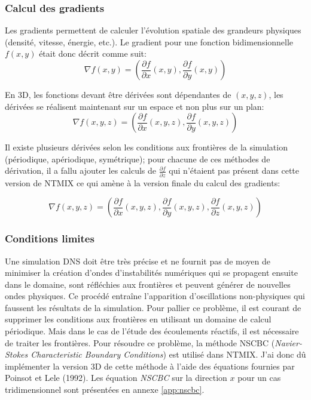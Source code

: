 
\subsubsection{Calcul des gradients}%

Les gradients permettent de calculer l'évolution spatiale des grandeurs physiques (densité, vitesse, énergie, etc.). Le gradient pour une fonction bidimensionnelle $f(x,y)$ était donc décrit comme suit:
$$\nabla f(x,y) =\left(\frac{\partial f}{\partial x}(x,y),\frac{\partial f}{\partial y}(x,y)\right) $$

En 3D, les fonctions devant être dérivées sont dépendantes de $(x,y,z)$, les dérivées se réalisent maintenant sur un espace et non plus sur un plan:
$$ \nabla f(x,y,z) =\left(\frac{\partial f}{\partial x}(x,y,z),\frac{\partial f}{\partial y}(x,y,z)\right)$$


Il existe plusieurs dérivées selon les conditions aux frontières de la simulation (périodique, apériodique, symétrique); pour chacune de ces méthodes de dérivation, il a fallu ajouter les calculs de $\frac{\partial f}{\partial z}$ qui n'étaient pas présent dans cette version de NTMIX ce qui amène à la version finale du calcul des gradients:

$$ \nabla f(x,y,z) =\left(\frac{\partial f}{\partial x}(x,y,z),\frac{\partial f}{\partial y}(x,y,z),\frac{\partial f}{\partial z}(x,y,z)\right)$$



\subsubsection{Conditions limites}\label{sec:nsbc}
Une simulation DNS doit être très précise et ne fournit pas de moyen de minimiser la création d'ondes d'instabilités numériques qui se propagent ensuite dans le domaine, sont réfléchies aux frontières et peuvent générer de nouvelles ondes physiques\cite{baritaud1996direct}. Ce procédé entraîne l'apparition d'oscillations non-physiques qui faussent les résultats de la simulation. Pour pallier ce problème, il est courant de supprimer les conditions aux frontières en utilisant un domaine de calcul périodique. Mais dans le cas de l'étude des écoulements réactifs, il est nécessaire de traiter les frontières. Pour résoudre ce problème, la méthode NSCBC (\textit{Navier-Stokes Characteristic Boundary Conditions}) est utilisé dans NTMIX. J'ai donc dû implémenter la version 3D de cette méthode à l'aide des équations fournies par Poinsot et Lele (1992)\cite{POINSOT1992104}. Les équation \textit{NSCBC} sur la direction $x$ pour un cas tridimensionnel sont présentées en annexe \ref{app:nscbc}. 



